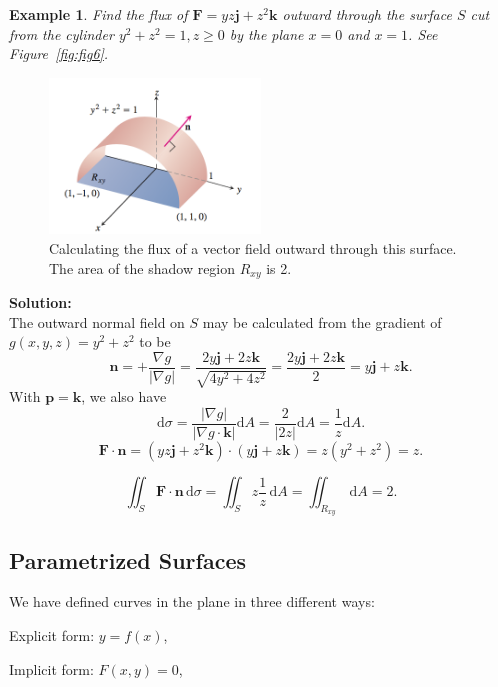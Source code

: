 \documentclass[a4paper,12pt]{article}
\newcommand\TheSolution{%
  \textbf{Solution:}\\%
}
\newtheorem{example}{Example}             %
\begin{document}
\begin{CJK}{UTF8}{gbsn}
\begin{example}
    Find the flux of $\bm{F} = yz\bm{j} + z^2\bm{k}$ outward through the 
    surface $S$ cut from the cylinder $y^2 + z^2 = 1, z \ge 0$ by the plane 
    $x = 0$ and $x = 1$. See Figure~\ref{fig:fig6}.
\end{example}
\begin{figure}[htbp]
    \centering 
    \includegraphics[height=0.5\textwidth, width=0.5\textwidth]{surface6.png}
    \caption{Calculating the flux of a vector field outward through
    this surface. The area of the shadow region $R_{xy}$ is 2.}
    \label{fig:fig8}
\end{figure}
\TheSolution The outward normal field on $S$ may be calculated from 
the gradient of $g(x,y,z) = y^2 + z^2$ to be 
\[
    \bm{n} = +\frac{\nabla g}{\left| \nabla g\right|} = 
    \frac{2y\bm{j} + 2z\bm{k}}{\sqrt{4y^2 + 4z^2}} = \frac{2y\bm{j}+2z\bm{k}}{2}
     = y\bm{j} + z\bm{k}.
    \]
With $\bm{p} = \bm{k}$, we also have 
\[
    \mathrm{d}\sigma = \frac{\left|\nabla g\right|}{\left|\nabla g \cdot \bm{k} \right|}
    \mathrm{d}A = \frac{2}{\left|2z\right|}\mathrm{d}A = \frac{1}{z}\mathrm{d}A.
    \]
\[
    \bm{F}\cdot \bm{n} = \left(yz\bm{j} + z^2\bm{k}\right) \cdot \left(y\bm{j} + z\bm{k}\right)
     = z\left(y^2 + z^2\right) = z.
    \]

\[
    \iint_S \bm{F} \cdot \bm{n} \, \mathrm{d}\sigma  = \iint_S z \frac{1}{z}\,\mathrm{d}A 
     = \iint_{R_{xy}} \, \mathrm{d}A = 2.
    \]

\subsection{Parametrized Surfaces}
We have defined curves in the plane in three different ways:

Explicit form: $y = f(x)$,

Implicit form: $F(x,y) = 0$,


\end{CJK}
\end{document}
